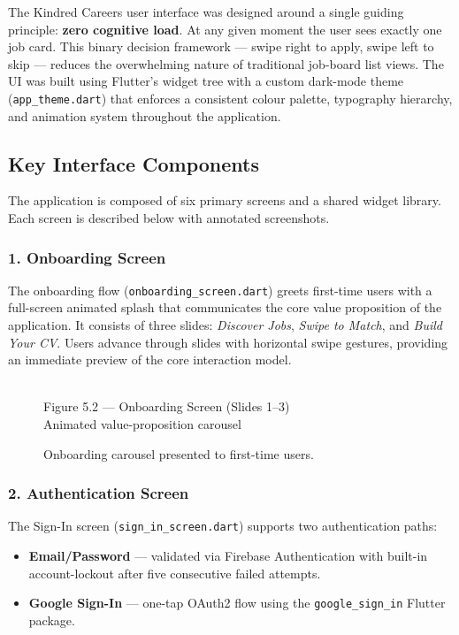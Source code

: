 \documentclass[12pt, a4paper, oneside]{report}
\newcommand{\placeholder}[1]{%
  \begin{tcolorbox}[
    colback  = lightgray,
    colframe = coderule,
    fontupper= \small\ttfamily\color{gray},
    halign   = center,
    valign   = center,
    height   = 6cm,
    sharp corners
  ]
    [IMAGE PLACEHOLDER]\\[4pt]#1
  \end{tcolorbox}%
}
\begin{document}
The Kindred Careers user interface was designed around a single guiding principle:
\textbf{zero cognitive load}. At any given moment the user sees exactly one job card. This
binary decision framework — swipe right to apply, swipe left to skip — reduces the
overwhelming nature of traditional job-board list views. The UI was built using Flutter's
widget tree with a custom dark-mode theme (\texttt{app\_theme.dart}) that enforces a
consistent colour palette, typography hierarchy, and animation system throughout the
application.

\subsection{Key Interface Components}
\label{sec:ui-components}

The application is composed of six primary screens and a shared widget library. Each screen is
described below with annotated screenshots.

\subsubsection*{1. Onboarding Screen}

The onboarding flow (\texttt{onboarding\_screen.dart}) greets first-time users with a
full-screen animated splash that communicates the core value proposition of the application.
It consists of three slides: \emph{Discover Jobs}, \emph{Swipe to Match}, and
\emph{Build Your CV}. Users advance through slides with horizontal swipe gestures, providing
an immediate preview of the core interaction model.

\begin{figure}[H]
  \centering
  \placeholder{Figure 5.2 — Onboarding Screen (Slides 1–3)\\Animated value-proposition carousel}
  \caption{Onboarding carousel presented to first-time users.}
  \label{fig:onboarding}
\end{figure}

\subsubsection*{2. Authentication Screen}

The Sign-In screen (\texttt{sign\_in\_screen.dart}) supports two authentication paths:
\begin{itemize}[itemsep=2pt]
  \item \textbf{Email/Password} — validated via Firebase Authentication with built-in
        account-lockout after five consecutive failed attempts.
  \item \textbf{Google Sign-In} — one-tap OAuth2 flow using the \texttt{google\_sign\_in}
        Flutter package.
\end{itemize}
\end{document}
